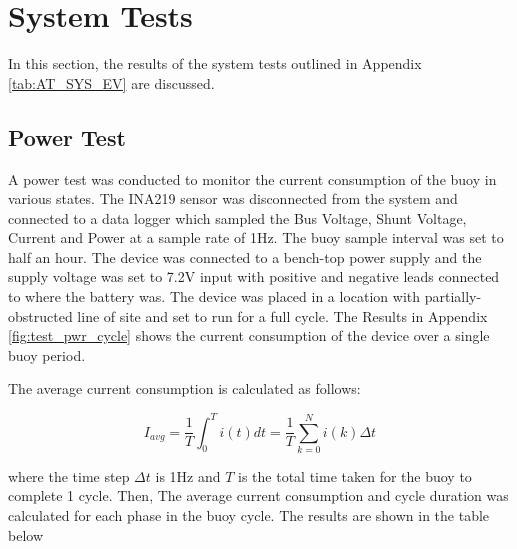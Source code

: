 \section{System Tests}
\label{sec:ch4_systests}
In this section, the results of the system tests outlined in Appendix \ref{tab:AT_SYS_EV} are discussed.

\subsection{Power Test}

A power test was conducted to monitor the current consumption of the buoy in various states. The INA219 sensor was disconnected from the system and connected to a data logger which sampled the Bus Voltage, Shunt Voltage, Current and Power at a sample rate of 1Hz. The buoy sample interval was set to half an hour. The device was connected to a bench-top power supply and the supply voltage was set to 7.2V input with positive and negative leads connected to where the battery was. The device was placed in a location with partially-obstructed line of site and set to run for a full cycle. The Results in Appendix \ref{fig:test_pwr_cycle} shows the current consumption of the device over a single buoy period.


The average current consumption is calculated as follows:

\begin{equation}
    I_{avg} = \frac{1}{T}\int_{0}^{T}i(t)dt = \frac{1}{T}\sum_{k=0}^{N}i(k)\Delta t
\end{equation}

where the time step $\Delta t$ is 1Hz and $T $ is the total time taken for the buoy to complete 1 cycle. Then, The average current consumption and cycle duration was calculated for each phase in the buoy cycle. The results are shown in the table below

